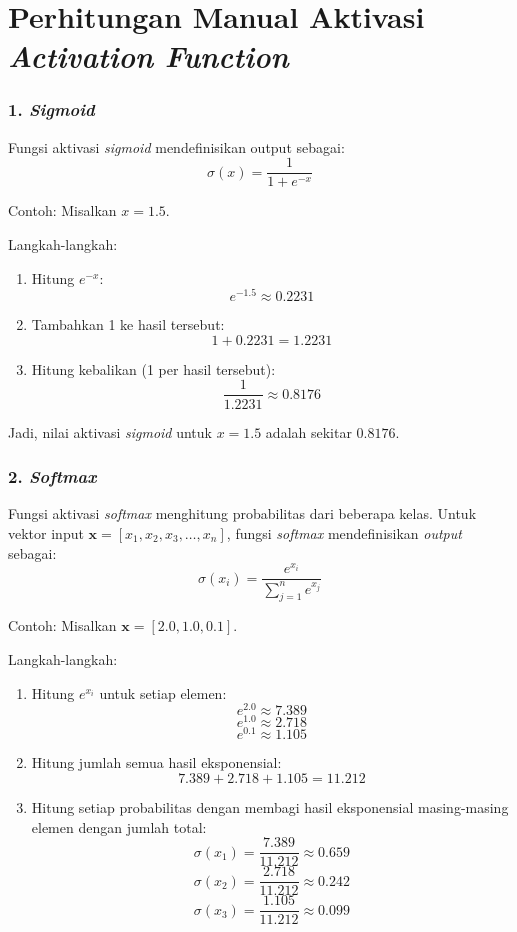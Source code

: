 \chapter{Perhitungan Manual Aktivasi \textit{Activation Function}}

\subsection*{1. \textit{Sigmoid}}
Fungsi aktivasi \textit{sigmoid} mendefinisikan output sebagai:
\[
\sigma(x) = \frac{1}{1 + e^{-x}}
\]

Contoh: Misalkan \( x = 1.5 \).

Langkah-langkah:
\begin{enumerate}
    \item Hitung \( e^{-x} \):
    \[
    e^{-1.5} \approx 0.2231
    \]

    \item Tambahkan 1 ke hasil tersebut:
    \[
    1 + 0.2231 = 1.2231
    \]

    \item Hitung kebalikan (1 per hasil tersebut):
    \[
    \frac{1}{1.2231} \approx 0.8176
    \]
\end{enumerate}

Jadi, nilai aktivasi \textit{sigmoid} untuk \( x = 1.5 \) adalah sekitar \( 0.8176 \).

\subsection*{2. \textit{Softmax}}
Fungsi aktivasi \textit{softmax} menghitung probabilitas dari beberapa kelas. Untuk vektor input \(\mathbf{x} = [x_1, x_2, x_3, \ldots, x_n]\), fungsi \textit{softmax} mendefinisikan \textit{output} sebagai:
\[
\sigma(x_i) = \frac{e^{x_i}}{\sum_{j=1}^{n} e^{x_j}}
\]

Contoh: Misalkan \(\mathbf{x} = [2.0, 1.0, 0.1]\).

Langkah-langkah:
\begin{enumerate}
    \item Hitung \( e^{x_i} \) untuk setiap elemen:
    \[
    e^{2.0} \approx 7.389
    \]
    \[
    e^{1.0} \approx 2.718
    \]
    \[
    e^{0.1} \approx 1.105
    \]

    \item Hitung jumlah semua hasil eksponensial:
    \[
    7.389 + 2.718 + 1.105 = 11.212
    \]

    \item Hitung setiap probabilitas dengan membagi hasil eksponensial masing-masing elemen dengan jumlah total:
    \[
    \sigma(x_1) = \frac{7.389}{11.212} \approx 0.659
    \]
    \[
    \sigma(x_2) = \frac{2.718}{11.212} \approx 0.242
    \]
    \[
    \sigma(x_3) = \frac{1.105}{11.212} \approx 0.099
    \]
\end{enumerate}

